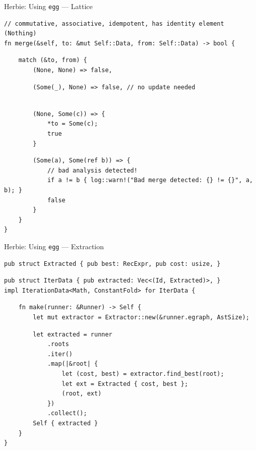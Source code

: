 \documentclass[8pt]{beamer}
\newcommand{\egg}{\texttt{egg} }
\begin{document}
\begin{frame}[fragile]{Herbie: Using \egg --- Lattice}
\pause
\begin{verbatim}
// commutative, associative, idempotent, has identity element (Nothing)
fn merge(&self, to: &mut Self::Data, from: Self::Data) -> bool {
\end{verbatim}
\pause
\begin{verbatim}
    match (&to, from) {
        (None, None) => false,
\end{verbatim}
\pause
\begin{verbatim}
        (Some(_), None) => false, // no update needed
\end{verbatim}
\pause
\begin{verbatim}

        (None, Some(c)) => {
            *to = Some(c);
            true
        }
\end{verbatim}
\pause
\begin{verbatim}
        (Some(a), Some(ref b)) => {
            // bad analysis detected!
            if a != b { log::warn!("Bad merge detected: {} != {}", a, b); }
            false
        }
    }
}
\end{verbatim}
\end{frame}

\begin{frame}[fragile]{Herbie: Using \egg --- Extraction}
\begin{verbatim}
pub struct Extracted { pub best: RecExpr, pub cost: usize, }
\end{verbatim}
\pause
\begin{verbatim}
pub struct IterData { pub extracted: Vec<(Id, Extracted)>, }
impl IterationData<Math, ConstantFold> for IterData {
\end{verbatim}
\pause
\begin{verbatim}
    fn make(runner: &Runner) -> Self {
        let mut extractor = Extractor::new(&runner.egraph, AstSize);
\end{verbatim}
\pause
\begin{verbatim}
        let extracted = runner
            .roots
            .iter()
            .map(|&root| {
                let (cost, best) = extractor.find_best(root);
                let ext = Extracted { cost, best };
                (root, ext)
            })
            .collect();
        Self { extracted }
    }
}
\end{verbatim}
\end{frame}
\end{document}
